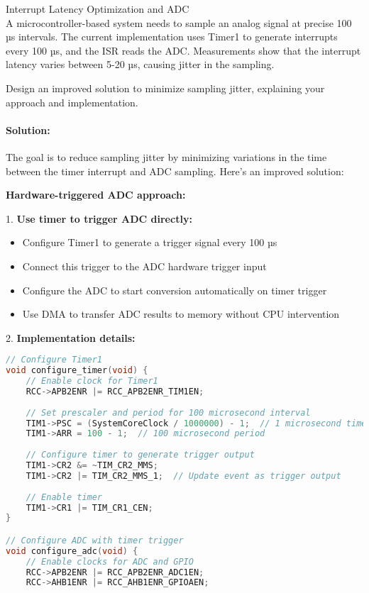 \begin{example2}{Interrupt Latency Optimization and ADC}\\
A microcontroller-based system needs to sample an analog signal at precise 100 µs intervals. The current implementation uses Timer1 to generate interrupts every 100 µs, and the ISR reads the ADC. Measurements show that the interrupt latency varies between 5-20 µs, causing jitter in the sampling.

Design an improved solution to minimize sampling jitter, explaining your approach and implementation.

\tcblower
\paragraph{Solution:}

The goal is to reduce sampling jitter by minimizing variations in the time between the timer interrupt and ADC sampling. Here's an improved solution:

\textbf{Hardware-triggered ADC approach:}

1. \textbf{Use timer to trigger ADC directly:}
   \begin{itemize}
     \item Configure Timer1 to generate a trigger signal every 100 µs
     \item Connect this trigger to the ADC hardware trigger input
     \item Configure the ADC to start conversion automatically on timer trigger
     \item Use DMA to transfer ADC results to memory without CPU intervention
   \end{itemize}

2. \textbf{Implementation details:}
\begin{lstlisting}[language=C, style=basesmol]
// Configure Timer1
void configure_timer(void) {
    // Enable clock for Timer1
    RCC->APB2ENR |= RCC_APB2ENR_TIM1EN;
    
    // Set prescaler and period for 100 microsecond interval
    TIM1->PSC = (SystemCoreClock / 1000000) - 1;  // 1 microsecond timer ticks
    TIM1->ARR = 100 - 1;  // 100 microsecond period
    
    // Configure timer to generate trigger output
    TIM1->CR2 &= ~TIM_CR2_MMS;
    TIM1->CR2 |= TIM_CR2_MMS_1;  // Update event as trigger output
    
    // Enable timer
    TIM1->CR1 |= TIM_CR1_CEN;
}

// Configure ADC with timer trigger
void configure_adc(void) {
    // Enable clocks for ADC and GPIO
    RCC->APB2ENR |= RCC_APB2ENR_ADC1EN;
    RCC->AHB1ENR |= RCC_AHB1ENR_GPIOAEN;
    

\end{lstlisting}
\end{example2}
